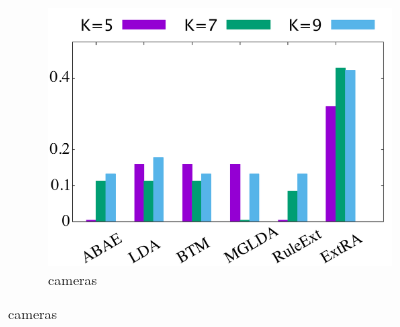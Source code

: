 \begin{figure}[!ht]
\begin{subfigure}{.333\textwidth}
		\includegraphics[width=0.99\linewidth]{figures/cameras_h}
		\caption{cameras}
		\label{fig:cameras_h}
	\end{subfigure}
	

\end{figure}
